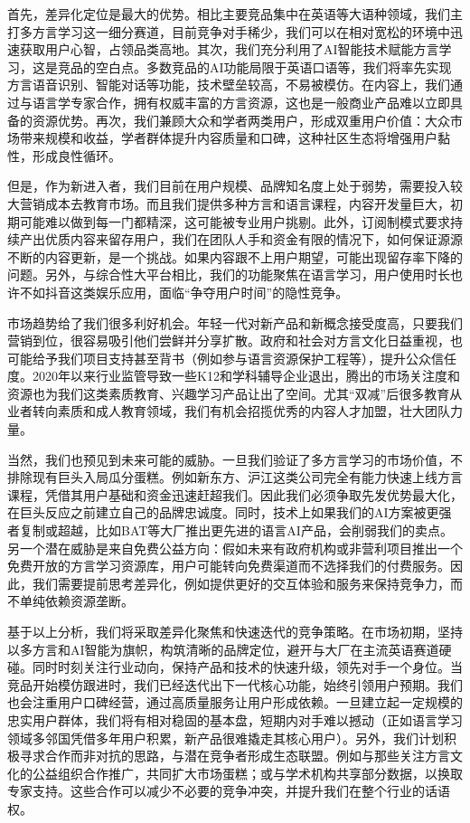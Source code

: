 首先，差异化定位是最大的优势。相比主要竞品集中在英语等大语种领域，我们主打多方言学习这一细分赛道，目前竞争对手稀少，我们可以在相对宽松的环境中迅速获取用户心智，占领品类高地。其次，我们充分利用了AI智能技术赋能方言学习，这是竞品的空白点。多数竞品的AI功能局限于英语口语等，我们将率先实现方言语音识别、智能对话等功能，技术壁垒较高，不易被模仿。在内容上，我们通过与语言学专家合作，拥有权威丰富的方言资源，这也是一般商业产品难以立即具备的资源优势。再次，我们兼顾大众和学者两类用户，形成双重用户价值：大众市场带来规模和收益，学者群体提升内容质量和口碑，这种社区生态将增强用户黏性，形成良性循环。

但是，作为新进入者，我们目前在用户规模、品牌知名度上处于弱势，需要投入较大营销成本去教育市场。而且我们提供多种方言和语言课程，内容开发量巨大，初期可能难以做到每一门都精深，这可能被专业用户挑剔。此外，订阅制模式要求持续产出优质内容来留存用户，我们在团队人手和资金有限的情况下，如何保证源源不断的内容更新，是一个挑战。如果内容跟不上用户期望，可能出现留存率下降的问题。另外，与综合性大平台相比，我们的功能聚焦在语言学习，用户使用时长也许不如抖音这类娱乐应用，面临“争夺用户时间”的隐性竞争。

市场趋势给了我们很多利好机会。年轻一代对新产品和新概念接受度高，只要我们营销到位，很容易吸引他们尝鲜并分享扩散。政府和社会对方言文化日益重视，也可能给予我们项目支持甚至背书（例如参与语言资源保护工程等），提升公众信任度。2020年以来行业监管导致一些K12和学科辅导企业退出，腾出的市场关注度和资源也为我们这类素质教育、兴趣学习产品让出了空间。尤其“双减”后很多教育从业者转向素质和成人教育领域，我们有机会招揽优秀的内容人才加盟，壮大团队力量。

当然，我们也预见到未来可能的威胁。一旦我们验证了多方言学习的市场价值，不排除现有巨头入局瓜分蛋糕。例如新东方、沪江这类公司完全有能力快速上线方言课程，凭借其用户基础和资金迅速赶超我们。因此我们必须争取先发优势最大化，在巨头反应之前建立自己的品牌忠诚度。同时，技术上如果我们的AI方案被更强者复制或超越，比如BAT等大厂推出更先进的语言AI产品，会削弱我们的卖点。另一个潜在威胁是来自免费公益方向：假如未来有政府机构或非营利项目推出一个免费开放的方言学习资源库，用户可能转向免费渠道而不选择我们的付费服务。因此，我们需要提前思考差异化，例如提供更好的交互体验和服务来保持竞争力，而不单纯依赖资源垄断。

基于以上分析，我们将采取差异化聚焦和快速迭代的竞争策略。在市场初期，坚持以多方言和AI智能为旗帜，构筑清晰的品牌定位，避开与大厂在主流英语赛道硬碰。同时时刻关注行业动向，保持产品和技术的快速升级，领先对手一个身位。当竞品开始模仿跟进时，我们已经迭代出下一代核心功能，始终引领用户预期。我们也会注重用户口碑经营，通过高质量服务让用户形成依赖。一旦建立起一定规模的忠实用户群体，我们将有相对稳固的基本盘，短期内对手难以撼动（正如语言学习领域多邻国凭借多年用户积累，新产品很难撬走其核心用户）。另外，我们计划积极寻求合作而非对抗的思路，与潜在竞争者形成生态联盟。例如与那些关注方言文化的公益组织合作推广，共同扩大市场蛋糕；或与学术机构共享部分数据，以换取专家支持。这些合作可以减少不必要的竞争冲突，并提升我们在整个行业的话语权。

